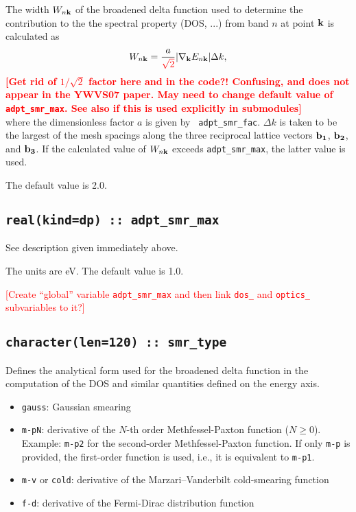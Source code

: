 The width $W_{n{\bf k}}$ of the broadened delta function used to
determine the contribution to the the spectral property (DOS, ...) from band $n$ at point ${\bf k}$
is calculated as
%
$$
W_{n{\bf k}}=\frac{a}{\textcolor{red}{\sqrt{2}}}\vert
\nabla_{\bf k} E_{n{\bf k}}\vert \Delta k,
$$ 
%
\textcolor{red}{{\bf [Get rid of $1/\sqrt{2}$ factor here and in the code?! 
Confusing, and does not appear in the YWVS07 paper. May need to change default value of
{\tt adpt\_smr\_max}. See also if this is used explicitly in submodules]}}\\
where the dimensionless factor $a$ is given by {\tt
  adpt\_smr\_fac}. $\Delta k$ is taken to be the largest of
the mesh spacings along the three reciprocal lattice vectors ${\bf
  b_1}$, ${\bf b_2}$, and ${\bf b_3}$.  If the calculated value of
$W_{n{\bf k}}$ exceeds {\tt adpt\_smr\_max}, the latter
value is used.

The default value is 2.0.

\subsection[adpt\_smr\_max]{\tt real(kind=dp) ::
  adpt\_smr\_max}

See description given immediately above.

The units are eV. The default value is 1.0.

\textcolor{red}{[Create ``global'' variable {\tt adpt\_smr\_max} and then link
{\tt dos\_} and {\tt optics\_} subvariables to it?]}

\subsection[smr\_type]{\tt  character(len=120) :: smr\_type}

Defines the analytical form used for the broadened delta function in
the computation of the DOS and similar quantities defined on the
energy axis.

\begin{itemize}
  
\item
  {\tt gauss}: Gaussian smearing

\item
  {\tt m-pN}: derivative of the $N$-th order
    Methfessel-Paxton function ($N\geq 0$). Example: {\tt m-p2} for the
  second-order Methfessel-Paxton function. If only {\tt m-p} is
  provided, the first-order function is used, i.e., it is equivalent to {\tt m-p1}.

\item
  {\tt m-v} or {\tt cold}: derivative of the Marzari--Vanderbilt cold-smearing function

\item
  {\tt f-d}: derivative of the Fermi-Dirac distribution function

\end{itemize}

